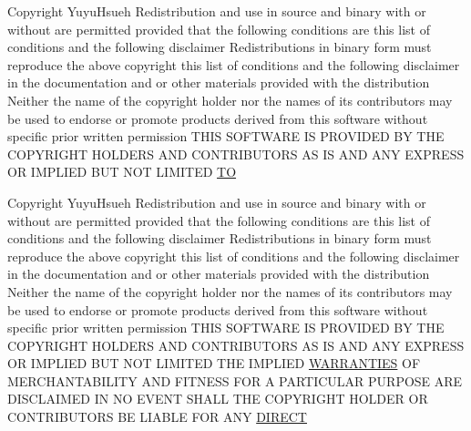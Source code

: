 \begin{DoxyCompactItemize}
\item 
Copyright Yuyu\+Hsueh Redistribution and use in source and binary with or without are permitted provided that the following conditions are this list of conditions and the following disclaimer Redistributions in binary form must reproduce the above copyright this list of conditions and the following disclaimer in the documentation and or other materials provided with the distribution Neither the name of the copyright holder nor the names of its contributors may be used to endorse or promote products derived from this software without specific prior written permission T\+H\+IS S\+O\+F\+T\+W\+A\+RE IS P\+R\+O\+V\+I\+D\+ED BY T\+HE C\+O\+P\+Y\+R\+I\+G\+HT H\+O\+L\+D\+E\+RS A\+ND C\+O\+N\+T\+R\+I\+B\+U\+T\+O\+RS AS IS A\+ND A\+NY E\+X\+P\+R\+E\+SS OR I\+M\+P\+L\+I\+ED B\+UT N\+OT L\+I\+M\+I\+T\+ED \hyperlink{license_8txt_a4bddb9a7dc45727be85d1869ee6c870d}{TO}
\item 
Copyright Yuyu\+Hsueh Redistribution and use in source and binary with or without are permitted provided that the following conditions are this list of conditions and the following disclaimer Redistributions in binary form must reproduce the above copyright this list of conditions and the following disclaimer in the documentation and or other materials provided with the distribution Neither the name of the copyright holder nor the names of its contributors may be used to endorse or promote products derived from this software without specific prior written permission T\+H\+IS S\+O\+F\+T\+W\+A\+RE IS P\+R\+O\+V\+I\+D\+ED BY T\+HE C\+O\+P\+Y\+R\+I\+G\+HT H\+O\+L\+D\+E\+RS A\+ND C\+O\+N\+T\+R\+I\+B\+U\+T\+O\+RS AS IS A\+ND A\+NY E\+X\+P\+R\+E\+SS OR I\+M\+P\+L\+I\+ED B\+UT N\+OT L\+I\+M\+I\+T\+ED T\+HE I\+M\+P\+L\+I\+ED \hyperlink{license_8txt_a042eb66328050ad88743187ae8e43b95}{W\+A\+R\+R\+A\+N\+T\+I\+ES} OF M\+E\+R\+C\+H\+A\+N\+T\+A\+B\+I\+L\+I\+TY A\+ND F\+I\+T\+N\+E\+SS F\+OR A P\+A\+R\+T\+I\+C\+U\+L\+AR P\+U\+R\+P\+O\+SE A\+RE D\+I\+S\+C\+L\+A\+I\+M\+ED IN NO E\+V\+E\+NT S\+H\+A\+LL T\+HE C\+O\+P\+Y\+R\+I\+G\+HT H\+O\+L\+D\+ER OR C\+O\+N\+T\+R\+I\+B\+U\+T\+O\+RS BE L\+I\+A\+B\+LE F\+OR A\+NY \hyperlink{license_8txt_a9ecfdaf89f3cf85421feb43ef16f372d}{D\+I\+R\+E\+CT}
\item 

\end{DoxyCompactItemize}
